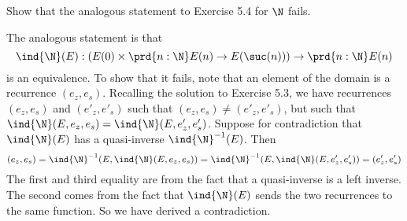 Show that the analogous statement to Exercise 5.4 for $\N$ fails.


 \soln
The analogous statement is that
\[
  \ind{\N}(E) : \left(E(0) \times \prd{n:\N}E(n) \to E(\suc(n))\right)
  \to
  \prd{n:\N}E(n)
\]
is an equivalence.  To show that it fails, note that an element of the domain
is a recurrence $(e_{z}, e_{s})$.  Recalling the solution to Exercise 5.3, we
have recurrences $(e_{z}, e_{s})$ and $(e'_{z}, e'_{s})$ such that $(e_{z},
e_{s}) \neq (e'_{z}, e'_{s})$, but such that $\ind{\N}(E, e_{z}, e_{s}) =
\ind{\N}(E, e'_{z}, e'_{s})$.  Suppose for contradiction that
$\ind{\N}(E)$ has a quasi-inverse $\ind{\N}^{-1}(E)$.  Then 
\[
  (e_{z}, e_{s}) 
  =
  \ind{\N}^{-1}(E, \ind{\N}(E, e_{z}, e_{s}))
  =
  \ind{\N}^{-1}(E, \ind{\N}(E, e'_{z}, e'_{s}))
  =
  (e'_{z}, e'_{s}) 
\]
The first and third equality are from the fact that a quasi-inverse is a left
inverse.  The second comes from the fact that $\ind{\N}(E)$ sends the two
recurrences to the same function.  So we have derived a contradiction.
